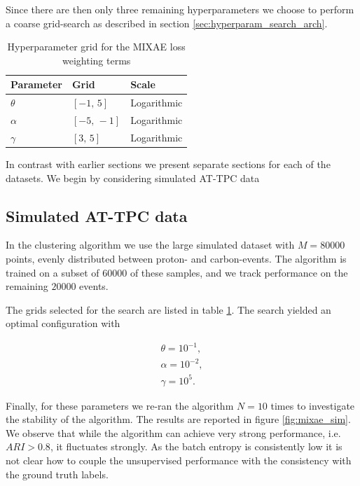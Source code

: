 Since there are then only three remaining hyperparameters we choose to perform a coarse grid-search as described in section \ref{sec:hyperparam_search_arch}.

\begin{table}
\centering
\caption{Hyperparameter grid for the MIXAE loss weighting terms}\label{tab:mixae_loss_weights}
\begin{tabular}{lll}
\toprule
Parameter & Grid & Scale \\
\midrule 
$\theta$ & $[-1,\, 5]$ & Logarithmic \\
$\alpha$ & $[-5,\, -1]$ & Logarithmic \\
$\gamma$ & $[3,\, 5]$ & Logarithmic
\end{tabular}
\end{table}

In contrast with earlier sections we present separate sections for each of the datasets. We begin by considering simulated AT-TPC data

\subsection{Simulated AT-TPC data}

In the clustering algorithm we use the large simulated dataset with $M=80000$ points, evenly distributed between proton- and carbon-events. The algorithm is trained on a subset of $60000$ of these samples, and we track performance on the remaining $20000$ events. 

The grids selected for the search are listed in table \ref{tab:mixae_loss_weights}. The search yielded an optimal configuration with 

\begin{align}
\theta = 10^{-1}, \\
\alpha = 10^{-2}, \\
\gamma = 10^5.
\end{align}

Finally, for these parameters we re-ran the algorithm $N=10$ times to investigate the stability of the algorithm. The results are reported in figure \ref{fig:mixae_sim}. We observe that while the algorithm can achieve very strong performance, i.e. $ARI > 0.8$, it fluctuates strongly. As the batch entropy is consistently low it is not clear how to couple the unsupervised performance with the consistency with the ground truth labels.

